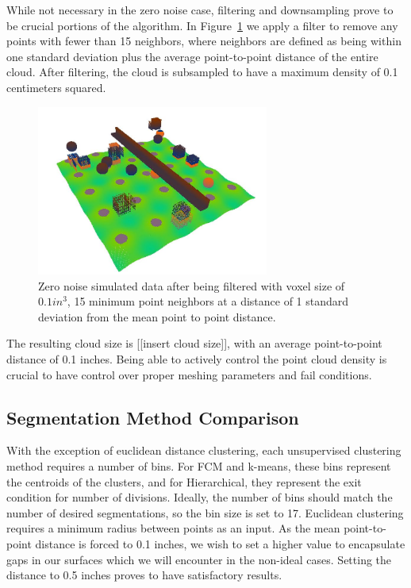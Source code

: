 \documentclass[12pt]{drexelthesis}
\let\Oldsubsection\subsection
\renewcommand{\subsection}{\FloatBarrier\Oldsubsection}
\begin{document}
While not necessary in the zero noise case, filtering and downsampling prove to be crucial portions of the algorithm. In Figure~\ref{zeronoise:filtered} we apply a filter to remove any points with fewer than 15 neighbors, where neighbors are defined as being within one standard deviation plus the average point-to-point distance of the entire cloud. After filtering, the cloud is subsampled to have a maximum density of 0.1 centimeters squared.


\begin{figure}[!ht]
	\centering
		\includegraphics[width=3in]{simulated-lab-scan/0noise/sim-lab-0noise-DS01-k15std1.jpg}
		\caption[Zero noise simulated data after being filtered with voxel size of 0.1 $in^{3}$, 15 minimum point neighbors at a distance of 1 standard deviation from the mean point to point distance]{\centering Zero noise simulated data after being filtered with voxel size of $0.1 in^{3}$, 15 minimum point neighbors at a distance of 1 standard deviation from the mean point to point distance.}
	\label{zeronoise:filtered}
\end{figure}

The resulting cloud size is [[insert cloud size]], with an average point-to-point distance of 0.1 inches. Being able to actively control the point cloud density is crucial to have control over proper meshing parameters and fail conditions.

\subsection{Segmentation Method Comparison}

With the exception of euclidean distance clustering, each unsupervised clustering method requires a number of bins. For FCM and k-means, these bins represent the centroids of the clusters, and for Hierarchical, they represent the exit condition for number of divisions. Ideally, the number of bins should match the number of desired segmentations, so the bin size is set to 17. Euclidean clustering requires a minimum radius between points as an input. As the mean point-to-point distance is forced to 0.1 inches, we wish to set a higher value to encapsulate gaps in our surfaces which we will encounter in the non-ideal cases. Setting the distance to 0.5 inches proves to have satisfactory results.
\end{document}
